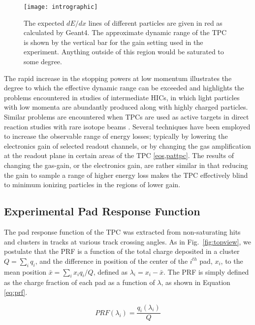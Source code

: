   
\begin{figure}[ht!]
\texttt{[image: intrographic]}
\caption{The expected $dE/dx$ lines of different particles are given in red as calculated by Geant4. The approximate dynamic range of the TPC is shown by the vertical bar for the gain setting used in the experiment. Anything outside of this region would be saturated to some degree.}
\label{fig:intro}
\end{figure}

The rapid increase in the stopping powers at low momentum illustrates the degree to which the effective dynamic range can be exceeded and highlights the problems encountered in studies of intermediate HICs, in which light particles with low momenta are abundantly produced along with highly charged particles. Similar problems are encountered when TPCs are used as active targets in direct reaction studies with rare isotope beams \cite{pattpc}. Several techniques have been employed to increase the observable range of energy losses; typically by lowering the electronics gain of selected readout channels, or by changing the gas amplification at the readout plane in certain areas of the TPC \cref{eos,pattpc}. The results of changing the gas-gain, or the electronics gain, are rather similar in that reducing the gain to sample a range of higher energy loss makes the TPC effectively blind to minimum ionizing particles in  the regions of lower gain.


\subsection{Experimental Pad Response Function}

The pad response function of the TPC was extracted from non-saturating hits and clusters in tracks at various track crossing angles. As in Fig.~\ref{fig:topview}, we postulate that the PRF is a function of the total charge deposited in a cluster $Q = \sum_i q_i$, and the difference in position of the center of the $i^{th}$ pad, $x_i$, to the mean position $\bar{x} = \sum_i x_i q_i/Q$, defined as $\lambda_i = x_i-\bar{x}$. The PRF is simply defined as the charge fraction of each pad as a function of $\lambda$, as shown in Equation \ref{eq:prf}. 

\begin{equation}\label{eq:prf}
PRF(\lambda_i) = \frac{q_i(\lambda_i)}{Q}
\end{equation}

